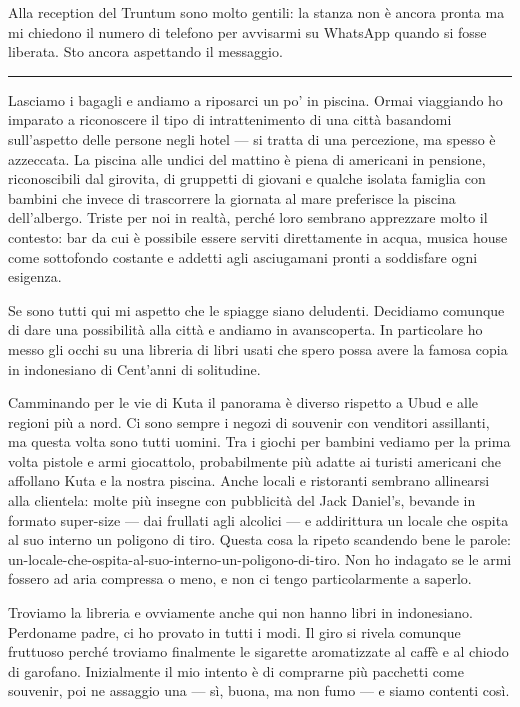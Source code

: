 Alla reception del Truntum sono molto gentili: la stanza non è ancora pronta ma mi chiedono il numero di telefono per avvisarmi su WhatsApp quando si fosse liberata. Sto ancora aspettando il messaggio.

\begin{center}
    \noindent\rule{0.6\textwidth}{0.4pt}
\end{center}

Lasciamo i bagagli e andiamo a riposarci un po' in piscina. Ormai viaggiando ho imparato a riconoscere il tipo di intrattenimento di una città basandomi sull'aspetto delle persone negli hotel — si tratta di una percezione, ma spesso è azzeccata. La piscina alle undici del mattino è piena di americani in pensione, riconoscibili dal girovita, di gruppetti di giovani e qualche isolata famiglia con bambini che invece di trascorrere la giornata al mare preferisce la piscina dell'albergo. Triste per noi in realtà, perché loro sembrano apprezzare molto il contesto: bar da cui è possibile essere serviti direttamente in acqua, musica house come sottofondo costante e addetti agli asciugamani pronti a soddisfare ogni esigenza.

Se sono tutti qui mi aspetto che le spiagge siano deludenti. Decidiamo comunque di dare una possibilità alla città e andiamo in avanscoperta. In particolare ho messo gli occhi su una libreria di libri usati che spero possa avere la famosa copia in indonesiano di Cent'anni di solitudine.

Camminando per le vie di Kuta il panorama è diverso rispetto a Ubud e alle regioni più a nord. Ci sono sempre i negozi di souvenir con venditori assillanti, ma questa volta sono tutti uomini. Tra i giochi per bambini vediamo per la prima volta pistole e armi giocattolo, probabilmente più adatte ai turisti americani che affollano Kuta e la nostra piscina. Anche locali e ristoranti sembrano allinearsi alla clientela: molte più insegne con pubblicità del Jack Daniel's, bevande in formato super-size — dai frullati agli alcolici — e addirittura un locale che ospita al suo interno un poligono di tiro. Questa cosa la ripeto scandendo bene le parole: un-locale-che-ospita-al-suo-interno-un-poligono-di-tiro. Non ho indagato se le armi fossero ad aria compressa o meno, e non ci tengo particolarmente a saperlo.

Troviamo la libreria e ovviamente anche qui non hanno libri in indonesiano. Perdoname padre, ci ho provato in tutti i modi. Il giro si rivela comunque fruttuoso perché troviamo finalmente le sigarette aromatizzate al caffè e al chiodo di garofano. Inizialmente il mio intento è di comprarne più pacchetti come souvenir, poi ne assaggio una — sì, buona, ma non fumo — e siamo contenti così.

